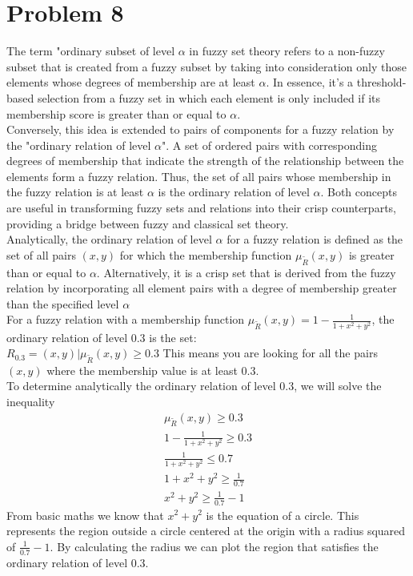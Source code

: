 \section{Problem 8}
The term "ordinary subset of level $\alpha$ in fuzzy set theory refers to a non-fuzzy subset that is created from a fuzzy subset by taking into consideration only those elements whose degrees of membership are at least $\alpha$. In essence, it's a threshold-based selection from a fuzzy set in which each element is only included if its membership score is greater than or equal to $\alpha$.\\
Conversely, this idea is extended to pairs of components for a fuzzy relation by the "ordinary relation of level $\alpha$". A set of ordered pairs with corresponding degrees of membership that indicate the strength of the relationship between the elements form a fuzzy relation. Thus, the set of all pairs whose membership in the fuzzy relation is at least $\alpha$ is the ordinary relation of level $\alpha$. Both concepts are useful in transforming fuzzy sets and relations into their crisp counterparts, providing a bridge between fuzzy and classical set theory.\\

Analytically, the ordinary relation of level $\alpha$ for a fuzzy relation is defined as the set of all pairs $(x,y)$ for which the membership function $\mu_{\tilde{R}}(x,y)$ is greater than or equal to $\alpha$. Alternatively, it is a crisp set that is derived from the fuzzy relation by incorporating all element pairs with a degree of membership greater than the specified level $\alpha$\\

For a fuzzy relation with a membership function $\mu_{\tilde{R}}(x,y) = 1 - \frac{1}{1+x^2+y^2}$, the ordinary relation of level $0.3$ is the set:\\
$R_{0.3} = {(x,y) | \mu_{\tilde{R}}(x,y) \geq 0.3}$
This means you are looking for all the pairs $(x,y)$ where the membership value is at least $0.3$.\\

To determine analytically the ordinary relation of level $0.3$, we will solve the inequality
\begin{align*}
	\mu_{\tilde{R}}(x,y) \geq 0.3 \\
	1 - \frac{1}{1+x^2+y^2} \geq 0.3 \\
	\frac{1}{1+x^2+y^2} \leq 0.7 \\
	1 + x^2 + y^2 \geq \frac{1}{0.7} \\
	x^2 + y^2 \geq \frac{1}{0.7} - 1
\end{align*}
From basic maths we know that $	x^2 + y^2$ is the equation of a circle. This represents the region outside a circle centered at the origin with a radius squared of $\frac{1}{0.7} - 1$. By calculating the radius we can plot the region that satisfies the ordinary relation of level 0.3.